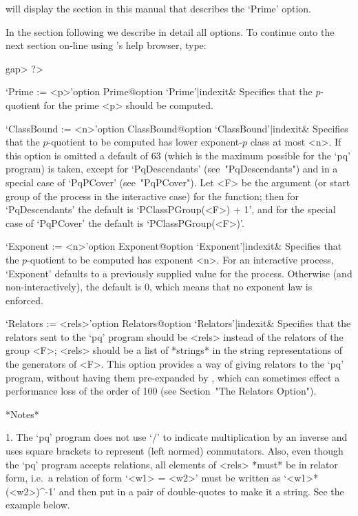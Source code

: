 will display the section  in  this  manual  that  describes  the  `Prime'
option.

In the section following we describe in detail all {\ANUPQ}  options.  To
continue onto the next section on-line using {\GAP}'s help browser, type:

\begintt
gap> ?>
\endtt


\beginitems

\>`Prime := <p>'{option Prime}@{option `Prime'|indexit}&
Specifies that the $p$-quotient for the prime  <p>  should  be  computed.

\>`ClassBound := <n>'{option  ClassBound}@{option  `ClassBound'|indexit}&
Specifies that the $p$-quotient to be  computed  has  lower  exponent-$p$
class at most <n>. If this option is omitted a default of  63  (which  is
the  maximum  possible  for  the  `pq'  program)  is  taken,  except   for
`PqDescendants' (see~"PqDescendants") and in a special case of `PqPCover'
(see~"PqPCover"). Let <F> be the argument (or start group of the  process
in the interactive case) for the function; then for  `PqDescendants'  the
default  is  `PClassPGroup(<F>)  +  1',  and  for  the  special  case  of
`PqPCover' the default is `PClassPGroup(<F>)'.

\>`Exponent := <n>'{option Exponent}@{option `Exponent'|indexit}&
Specifies that the $p$-quotient to be computed has exponent <n>.  For  an
interactive process, `Exponent' defaults to a previously  supplied  value
for the process. Otherwise (and non-interactively),  the  default  is  0,
which means that no exponent law is enforced.

\>`Relators := <rels>'{option Relators}@{option `Relators'|indexit}&
Specifies that the relators sent to the `pq'  program  should  be  <rels>
instead of the relators of the group <F>; <rels>  should  be  a  list  of
*strings* in the string representations of  the  generators  of  <F>.  
 This option provides a way of giving  relators  to
the `pq' program, without having them pre-expanded by {\GAP},  which  can
sometimes effect a performance loss of the order of 100 (see Section~"The
Relators Option").

*Notes*
\beginlist%

\item{1.}
The `pq' program does not  use  `/'  to  indicate  multiplication  by  an
inverse and uses square brackets to represent (left normed)  commutators.
Also, even though the `pq' program accepts  relations,  all  elements  of
<rels> *must* be in relator form, i.e.~a relation of form `<w1>  =  <w2>'
must  be  written  as  `<w1>*(<w2>)^-1'  and  then  put  in  a  pair   of
double-quotes to make it a string. See the example below.

